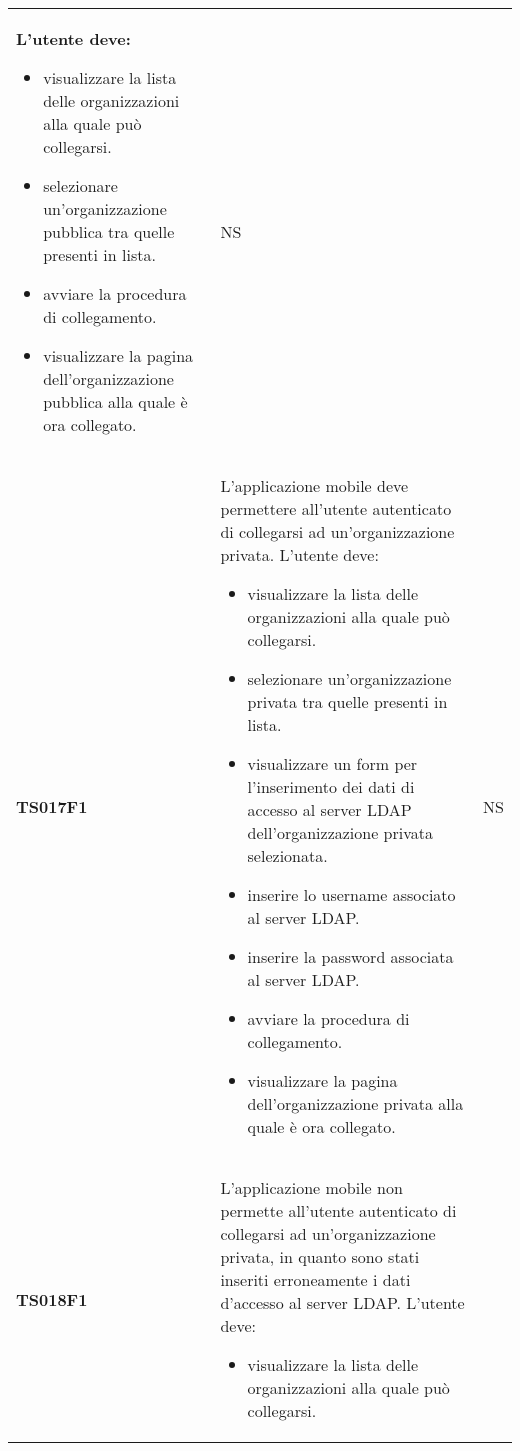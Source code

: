 \documentclass[../piano-di-qualifica.tex]{subfiles}
\begin{document}
\begin{centering}
\begin{longtable}[H]{>{\centering\bfseries}m{3cm} >{}p{10cm} >{\centering\arraybackslash}m{3cm}}
                      L'utente deve:
                      \begin{itemize}
                        \item visualizzare la lista delle organizzazioni alla quale può collegarsi.
                        \item selezionare un'organizzazione pubblica tra quelle presenti in lista.
                        \item avviare la procedura di collegamento.
                        \item visualizzare la pagina dell'organizzazione pubblica alla quale è ora collegato.
                      \end{itemize}
                    & NS \\
        TS017F1     & L'applicazione mobile deve permettere all'utente autenticato di collegarsi ad un'organizzazione privata. \newline
                      L'utente deve:
                        \begin{itemize}
                          \item visualizzare la lista delle organizzazioni alla quale può collegarsi.
                          \item selezionare un'organizzazione privata tra quelle presenti in lista.
                          \item visualizzare un form per l'inserimento dei dati di accesso al server LDAP dell'organizzazione privata selezionata.
                          \item inserire lo username associato al server LDAP\@.
                          \item inserire la password associata al server LDAP\@.
                          \item avviare la procedura di collegamento.
                          \item visualizzare la pagina dell'organizzazione privata alla quale è ora collegato.
                        \end{itemize}
                    & NS \\
        TS018F1     & L'applicazione mobile non permette all'utente autenticato di collegarsi ad un'organizzazione privata, in quanto sono stati inseriti erroneamente i dati d'accesso al server LDAP\@. \newline
                      L'utente deve:
                        \begin{itemize}
                          \item visualizzare la lista delle organizzazioni alla quale può collegarsi.

\end{itemize}
\end{longtable}
\end{centering}
\end{document}
